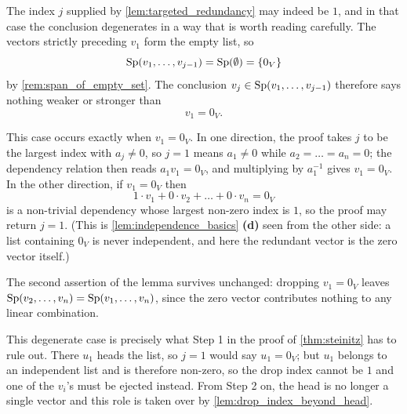 \begin{exercisesolution*}
\label{sol:redundancy_j_equals_one}
The index $j$ supplied by \cref{lem:targeted_redundancy} may indeed be $1$, and in that case the conclusion degenerates in a way that is worth reading carefully. The vectors strictly preceding $v_1$ form the empty list, so
\[
\operatorname{Sp}(v_1, \dots, v_{j-1}) = \operatorname{Sp}(\emptyset) = \{0_V\}
\]
by \cref{rem:span_of_empty_set}. The conclusion $v_j \in \operatorname{Sp}(v_1, \dots, v_{j-1})$ therefore says nothing weaker or stronger than
\[
v_1 = 0_V.
\]

This case occurs exactly when $v_1 = 0_V$. In one direction, the proof takes $j$ to be the largest index with $a_j \ne 0$, so $j = 1$ means $a_1 \ne 0$ while $a_2 = \dots = a_n = 0$; the dependency relation then reads $a_1 v_1 = 0_V$, and multiplying by $a_1^{-1}$ gives $v_1 = 0_V$. In the other direction, if $v_1 = 0_V$ then
\[
1 \cdot v_1 + 0 \cdot v_2 + \dots + 0 \cdot v_n = 0_V
\]
is a non-trivial dependency whose largest non-zero index is $1$, so the proof may return $j = 1$. (This is \cref{lem:independence_basics} \textbf{(d)} seen from the other side: a list containing $0_V$ is never independent, and here the redundant vector is the zero vector itself.)

The second assertion of the lemma survives unchanged: dropping $v_1 = 0_V$ leaves $\operatorname{Sp}(v_2, \dots, v_n) = \operatorname{Sp}(v_1, \dots, v_n)$, since the zero vector contributes nothing to any linear combination.

This degenerate case is precisely what Step 1 in the proof of \cref{thm:steinitz} has to rule out. There $u_1$ heads the list, so $j = 1$ would say $u_1 = 0_V$; but $u_1$ belongs to an independent list and is therefore non-zero, so the drop index cannot be $1$ and one of the $v_i$'s must be ejected instead. From Step 2 on, the head is no longer a single vector and this role is taken over by \cref{lem:drop_index_beyond_head}.
\end{exercisesolution*}



